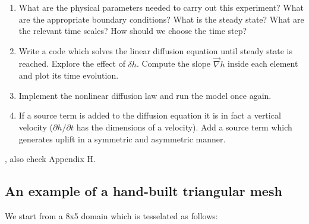 \begin{enumerate}
\item What are the physical parameters needed to carry out this experiment? 
What are the appropriate boundary conditions? 
What is the steady state? What are the relevant time scales? How should we choose the time step?
\item Write a code which solves the linear diffusion equation until steady state is reached.
Explore the effect of $\delta h$. Compute the slope $\vec\nabla h$ inside each element and plot 
its time evolution. 
\item Implement the nonlinear diffusion law and run the model once again. 
\item If a source term is added to the diffusion equation it is in fact a vertical velocity
($\partial h/\partial t$ has the dimensions of a velocity). Add a source term which generates 
uplift in a symmetric and asymmetric manner.  
\end{enumerate}

\Literature  \cite{thsh14} \cite{ster20}, also check Appendix H. 

\subsection{An example of a hand-built triangular mesh}

We start from a 8x5 domain which is tesselated as follows:

